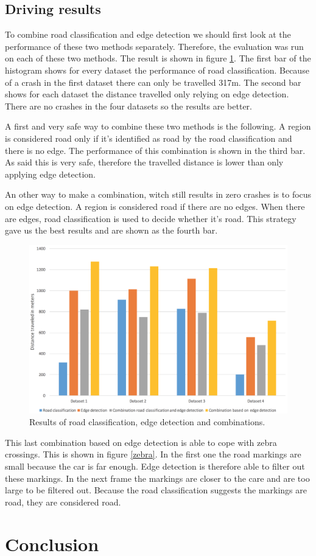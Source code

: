 \documentclass[runningheads,a4paper]{llncs}
\begin{document}
\subsection{Driving results}
To combine road classification and edge detection we should first look at the performance of these two methods separately. Therefore, the evaluation was run on each of these two methods. The result is shown in figure \ref{distance_result}. The first bar of the histogram shows for every dataset the performance of road classification. Because of a crash in the first dataset there can only be travelled 317m. The second bar shows for each dataset the distance travelled only relying on edge detection. There are no crashes in the four datasets so the results are better. 

A first and very safe way to combine these two methods is the following. A region is considered road only if it's identified as road by the road classification and there is no edge. The performance of this combination is shown in the third bar. As said this is very safe, therefore the travelled distance is lower than only applying edge detection. 

An other way to make a combination, witch still results in zero crashes is to focus on edge detection. A region is considered road if there are no edges. When there are edges, road classification is used to decide whether it's road. This strategy gave us the best results and are shown as the fourth bar.
\begin{figure}[ht]
	\centering
	\includegraphics[width=\textwidth]{fig/distance_result.png}
	\caption{Results of road classification, edge detection and combinations.\label{distance_result}}
\end{figure}

This last combination based on edge detection is able to cope with zebra crossings. This is shown in figure \ref{zebra}. In the first one the road markings are small because the car is far enough. Edge detection is therefore able to filter out these markings. In the next frame the markings are closer to the care and are too large to be filtered out. Because the road classification suggests the markings are road, they are considered road.

\section{Conclusion}
\newpage
{}

\end{document}

